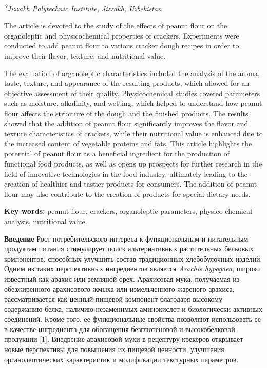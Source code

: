 {{{\emph{\textsuperscript{3}Jizzakh Polytechnic Institute, Jizzakh,
Uzbekistan}

The article is devoted to the study of the effects of peanut flour on
the organoleptic and physicochemical properties of crackers. Experiments
were conducted to add peanut flour to various cracker dough recipes in
order to improve their flavor, texture, and nutritional value.

The evaluation of organoleptic characteristics included the analysis of
the aroma, taste, texture, and appearance of the resulting products,
which allowed for an objective assessment of their quality.
Physicochemical studies covered parameters such as moisture, alkalinity,
and wetting, which helped to understand how peanut flour affects the
structure of the dough and the finished products. The results showed
that the addition of peanut flour significantly improves the flavor and
texture characteristics of crackers, while their nutritional value is
enhanced due to the increased content of vegetable proteins and fats.
This article highlights the potential of peanut flour as a beneficial
ingredient for the production of functional food products, as well as
opens up prospects for further research in the field of innovative
technologies in the food industry, ultimately leading to the creation of
healthier and tastier products for consumers. The addition of peanut
flour may also contribute to the creation of products for special
dietary needs.

{\bfseries Key words:} peanut flour, crackers, organoleptic parameters,
physico-chemical analysis, nutritional value.

{\bfseries Введение} Рост потребительского интереса к функциональным и
питательным продуктам питания стимулирует поиск альтернативных
растительных белковых компонентов, способных улучшить состав
традиционных хлебобулочных изделий. Одним из таких перспективных
ингредиентов является \emph{Arachis hypogaea}, широко известный как
арахис или земляной орех. Арахисовая мука, получаемая из обезжиренного
арахисового жмыха или измельченного жареного арахиса, рассматривается
как ценный пищевой компонент благодаря высокому содержанию белка,
наличию незаменимых аминокислот и биологически активных соединений.
Кроме того, ее функциональные свойства позволяют использовать ее в
качестве ингредиента для обогащения безглютеновой и высокобелковой
продукции {[}1{]}. Внедрение арахисовой муки в рецептуру крекеров
открывает новые перспективы для повышения их пищевой ценности, улучшения
органолептических характеристик и модификации текстурных параметров.

}}}
